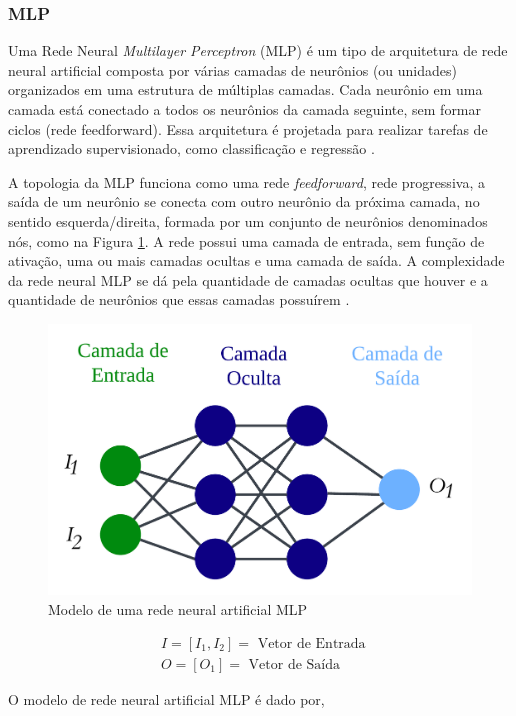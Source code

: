 \subsubsection{MLP}
 
Uma Rede Neural \textit{Multilayer Perceptron} (MLP) é um tipo de arquitetura de rede neural artificial composta por várias camadas de neurônios (ou unidades) organizados em uma estrutura de múltiplas camadas. Cada neurônio em uma camada está conectado a todos os neurônios da camada seguinte, sem formar ciclos (rede feedforward). Essa arquitetura é projetada para realizar tarefas de aprendizado supervisionado, como classificação e regressão \cite{QIN2023543}.

 A topologia da MLP funciona como uma rede \textit{feedforward}, rede progressiva, a saída de um neurônio se conecta com outro neurônio da próxima camada, no sentido esquerda/direita, formada por um conjunto de neurônios denominados nós, como  na Figura \ref{fig:ann}. A rede possui uma camada de entrada, sem função de ativação, uma ou mais camadas ocultas e uma camada de saída. A complexidade da rede neural MLP se dá pela quantidade de camadas ocultas que houver e a quantidade de neurônios que essas camadas possuírem \cite{Grubler2018}.
 
 \begin{figure}[!htb]
 	\centering
 	\caption{Modelo de uma rede neural artificial MLP}
 	\includegraphics[width=0.5\linewidth]{Modelos/Figuras/ann.pdf}
 	
 	\label{fig:ann}
  \end{figure}
 
 \begin{equation}
 	\begin{aligned}
 		& I=\left[I_1, I_2\right]=\text { Vetor de Entrada } \\
 		& O=\left[O_1\right]=\text { Vetor de Saída }
 	\end{aligned} \nonumber
 \end{equation}
 
 O modelo de rede neural artificial MLP é dado por,
 
